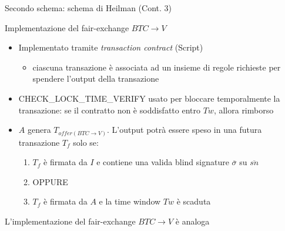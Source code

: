 \documentclass{beamer}
\begin{document}
  
  
  \begin{frame}{Secondo schema: schema di Heilman (Cont. 3)}
      \begin{block}{Implementazione del fair-exchange $BTC\rightarrow V$}
        \begin{itemize}
            \item Implementato tramite \emph{transaction contract} (Script)
            \begin{itemize}
                \item[\MVRightarrow] ciascuna transazione è associata ad un insieme di regole richieste per spendere l'output della transazione
            \end{itemize}
            \item CHECK\_LOCK\_TIME\_VERIFY usato per bloccare temporalmente la transazione: se il contratto non è soddisfatto entro $Tw$, allora rimborso 
            \item $A$ genera $T_{offer(BTC\rightarrow V)}$. L'output potrà essere speso in una futura transazione $T_f$ solo se:
            \begin{enumerate}
                \item $T_f$ è firmata da $I$ e contiene una valida blind signature $\overline\sigma$ su $\overline{sn}$
                \item[] OPPURE 
                \item $T_f$ è firmata da $A$ e la time window $Tw$ è scaduta
            \end{enumerate}
        \end{itemize}
      \end{block}
      \pause
      
      L'implementazione del fair-exchange $BTC\rightarrow V$ è analoga
  \end{frame}
  
  
  
\end{document}
